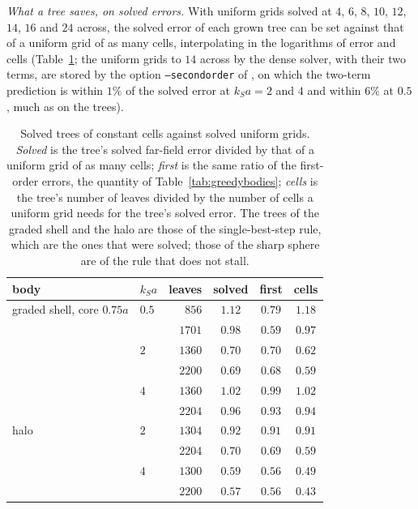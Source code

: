 \documentclass[11pt,a4paper]{article}
\begin{document}
\emph{What a tree saves, on solved errors.} With uniform grids solved at $4$, $6$, $8$, $10$, $12$,
$14$, $16$ and $24$ across, the solved error of each grown tree can be set against that of a uniform grid of
as many cells, interpolating in the logarithms of error and cells (Table~\ref{tab:treesolved}; the
uniform grids to $14$ across by the dense solver, with their two terms, are stored by the option
\texttt{--secondorder} of , on which the two-term
prediction is within $1\%$ of the solved error at $k_Sa=2$ and $4$ and within $6\%$ at $0.5$, much as on
the trees).
\begin{table}[htbp]
\centering
\caption{Solved trees of constant cells against solved uniform grids. \emph{Solved} is the tree's
solved far-field error divided by that of a uniform grid of as many cells; \emph{first} is the same
ratio of the first-order errors, the quantity of Table~\ref{tab:greedybodies}; \emph{cells} is the
tree's number of leaves divided by the number of cells a uniform grid needs for the tree's solved error.
The trees of the graded shell and the halo are those of the single-best-step rule, which are the ones
that were solved; those of the sharp sphere are of the rule that does not stall.}\label{tab:treesolved}
\small
\begin{tabular}{@{}llrccc@{}}
\toprule
body & $k_Sa$ & leaves & solved & first & cells \\
\midrule
graded shell, core $0.75a$ & $0.5$ & $856$  & $1.12$ & $0.79$ & $1.18$ \\
                           &       & $1701$ & $0.98$ & $0.59$ & $0.97$ \\
                           & $2$   & $1360$ & $0.70$ & $0.70$ & $0.62$ \\
                           &       & $2200$ & $0.69$ & $0.68$ & $0.59$ \\
                           & $4$   & $1360$ & $1.02$ & $0.99$ & $1.02$ \\
                           &       & $2204$ & $0.96$ & $0.93$ & $0.94$ \\
\midrule
halo                       & $2$   & $1304$ & $0.92$ & $0.91$ & $0.91$ \\
                           &       & $2204$ & $0.70$ & $0.69$ & $0.59$ \\
                           & $4$   & $1300$ & $0.59$ & $0.56$ & $0.49$ \\
                           &       & $2200$ & $0.57$ & $0.56$ & $0.43$ \\

\end{tabular}
\end{table}
\end{document}
